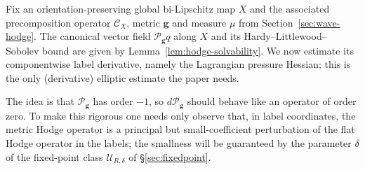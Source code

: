 \documentclass[11pt,reqno]{amsart}
\theoremstyle{plain}
\theoremstyle{definition}
\theoremstyle{remark}
\numberwithin{equation}{section}
\newcommand{\gmetric}{\mathbf g}
\begin{document}
Fix an orientation-preserving global bi-Lipschitz map $X$ and the associated
precomposition operator $\mathcal C_X$, metric $\gmetric$ and measure $\mu$ from
Section~\ref{sec:wave-hodge}.  The canonical vector field
$\mathcal P_{\gmetric}q$ along $X$ and its Hardy--Littlewood--Sobolev bound are given by
Lemma~\ref{lem:hodge-solvability}.  We now estimate its componentwise label
derivative, namely the Lagrangian pressure Hessian; this is the only (derivative) elliptic estimate the paper needs. 

The idea is that $\mathcal P_{\gmetric}$ has order $-1$, so $d\mathcal P_{\gmetric}$
should behave like an operator of order zero.  To make this rigorous one needs
only observe that, in label coordinates, the metric Hodge operator is a
principal but small-coefficient perturbation of the flat Hodge operator in the
labels; the smallness will be guaranteed by the parameter $\delta$ of the
fixed-point class $\mathcal U_{R,\delta}$ of \S\ref{sec:fixedpoint}.
\end{document}
